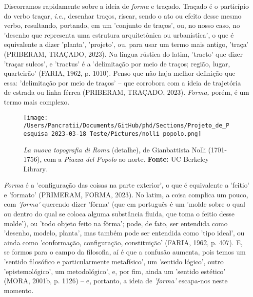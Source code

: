 \documentclass[]{report}
\begin{document}
Discorramos rapidamente sobre a ideia de \textit{forma} e traçado. Traçado é o particípio do verbo traçar, \textit{i.e.,} desenhar traços, riscar, sendo o ato ou efeito desse mesmo verbo, resultando, portando, em um 'conjunto de traços', ou, no nosso caso, no 'desenho que representa uma estrutura arquitetônica ou urbanística', o que é equivalente a dizer 'planta', 'projeto', ou, para usar um termo mais antigo, 'traça' (PRIBERAM, TRAÇADO, 2023). Na língua rústica do latim, 'tracto' que dizer 'traçar sulcos', e 'tractus' é a 'delimitação por meio de traços; região, lugar, quarteirão' (FARIA, 1962, p. 1010). Penso que não haja melhor definição que essa: 'delimitação por meio de traços' – que corrobora com a ideia de trajetória de estrada ou linha férrea (PRIBERAM, TRAÇADO, 2023). \textit{Forma,} porém, é um termo mais complexo.

 \begin{figure}
	\centering
	\texttt{[image: /Users/Pancratii/Documents/GitHub/phd/Sections/Projeto\_de\_Pesquisa\_2023-03-18\_Teste/Pictures/nolli\_popolo.png]}
	\captionsetup{labelfont=bf}
	\caption{\textit{La nuova topografia di Roma} (detalhe), de Gianbattista Nolli (1701-1756), com a \textit{Piazza del Popolo} ao norte. \textbf{Fonte:} UC Berkeley Library.}
	\label{fig:nolli_popolo}
\end{figure} 

\textit{Forma} é a 'configuração das coisas na parte exterior', o que é equivalente a 'feitio' e 'formato' (PRIMERAM, FORMA, 2023). No latim, a coisa complica um pouco, com \textit{'forma'} querendo dizer 'fôrma' (que em português é um 'molde sobre o qual ou dentro do qual se coloca alguma substância fluida, que toma o feitio desse molde'), ou 'todo objeto feito na fôrma'; pode, de fato, ser entendida como 'desenho, modelo, planta', mas também pode ser entendida como 'tipo ideal', ou ainda como 'conformação, configuração, constituição' (FARIA, 1962, p. 407). E, se formos para o campo da filosofia, aí é que a confusão aumenta, pois temos um 'sentido filosófico e particularmente metafísico', um 'sentido lógico', outro 'epistemológico', um metodológico', e, por fim, ainda um 'sentido estético' (MORA, 2001b, p. 1126) – e, portanto, a ideia de \textit{'forma'} escapa-nos neste momento.
\end{document}
